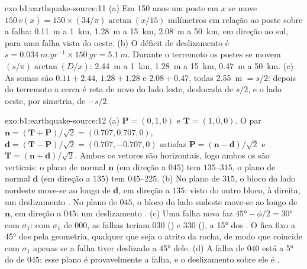 \begin{solution}{exo:b1:earthquake-source:11}
(a) Em 150 anos um poste em $x$ se move $150\,v(x) = 150\times(34/\pi)
\arctan(x/15)$ milímetros em relação ao poste sobre a falha: \qty{0.11}{m} a \qty{1}{km}, \qty{1.28}{m} a \qty{15}{km}, \qty{2.08}{m} a \qty{50}{km}, em direção ao sul, para uma falha  vista do oeste. (b) O déficit de deslizamento é
$s = \qty{0.034}{m.yr^{-1}}\times\qty{150}{yr} = \qty{5.1}{m}$. Durante o terremoto os postes se movem $(s/\pi)\arctan(D/x)$: \qty{2.44}{m} a
\qty{1}{km}, \qty{1.28}{m} a \qty{15}{km}, \qty{0.47}{m} a \qty{50}{km}. (c) As somas são $0.11 + 2.44$, $1.28 + 1.28$ e $2.08 + 0.47$, todas
\qty{2.55}{m} $= s/2$: depois do terremoto a cerca é reta de novo do lado leste, deslocada de $s/2$, e o lado oeste, por simetria, de $-s/2$.
\end{solution}

\begin{solution}{exo:b1:earthquake-source:12}
(a) $\mathbf P = (0, 1, 0)$ e $\mathbf T = (1, 0, 0)$. O par
$\mathbf n = (\mathbf T + \mathbf P)/\sqrt2 = (0.707, 0.707, 0)$,
$\mathbf d = (\mathbf T - \mathbf P)/\sqrt2 = (0.707, -0.707, 0)$ satisfaz
$\mathbf P = (\mathbf n - \mathbf d)/\sqrt2$ e $\mathbf T = (\mathbf n +
\mathbf d)/\sqrt2$. Ambos os vetores são horizontais, logo ambos os  são verticais: o plano de normal $\mathbf n$ (em direção a $045$) tem  $135$--$315$, o plano de normal $\mathbf d$ (em direção a $135$) tem  $045$--$225$. (b) No plano de  $315$, o bloco do lado nordeste move-se ao longo de $\mathbf d$,
em direção a $135$: visto do outro bloco, à direita, um deslizamento . No plano de  $045$, o bloco do lado sudeste move-se ao longo de $\mathbf n$,
em direção a $045$: um deslizamento . (c) Uma falha nova faz $\ang{45} - \phi/2 =
\ang{30}$ com $\sigma_1$: com $\sigma_1$ de  $000$, as falhas teriam  $030$ () e $330$ (), a \ang{15} dos .
O  fica fixo a \ang{45} dos  pela geometria, qualquer que seja o atrito da rocha, de modo que coincide com $\sigma_1$ apenas se a falha tiver deslizado a \ang{45} dele. (d) A falha de  $040$ está a \ang{5} do  de  $045$: esse plano é provavelmente a falha, e o deslizamento sobre ele é .
\end{solution}

